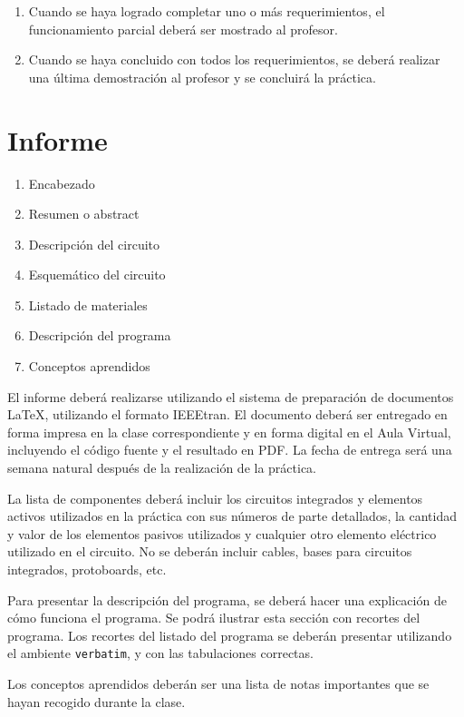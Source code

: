 \documentclass[12pt,letterpaper]{IEEEtran}
\begin{document}
\begin{enumerate}[resume]
	\item Cuando se haya logrado completar uno o más requerimientos, el funcionamiento parcial deberá ser mostrado al profesor.
	\item Cuando se haya concluido con todos los requerimientos, se deberá realizar una última demostración al profesor y se concluirá la práctica.
\end{enumerate}


\section{Informe}

\begin{enumerate}
  \item Encabezado
  \item Resumen o abstract
  \item Descripción del circuito
  \item Esquemático del circuito
  \item Listado de materiales
  \item Descripción del programa
  \item Conceptos aprendidos
\end{enumerate}

El informe deberá realizarse utilizando el sistema de preparación de documentos \LaTeX, utilizando el formato IEEEtran. El documento deberá ser entregado en forma impresa en la clase correspondiente y en forma digital en el Aula Virtual, incluyendo el código fuente y el resultado en PDF.  La fecha de entrega será una semana natural después de la realización de la práctica.

La lista de componentes deberá incluir los circuitos integrados y elementos activos utilizados en la práctica con sus números de parte detallados, la cantidad y valor de los elementos pasivos utilizados y cualquier otro elemento eléctrico utilizado en el circuito. No se deberán incluir cables, bases para circuitos integrados, protoboards, etc.


Para presentar la descripción del programa, se deberá hacer una explicación de cómo funciona el programa. Se podrá ilustrar esta sección con recortes del programa. Los recortes del listado del programa se deberán presentar utilizando el ambiente \texttt{verbatim}, y con las tabulaciones correctas. 

Los conceptos aprendidos deberán ser una lista de notas importantes que se hayan recogido durante la clase. 
\end{document}
